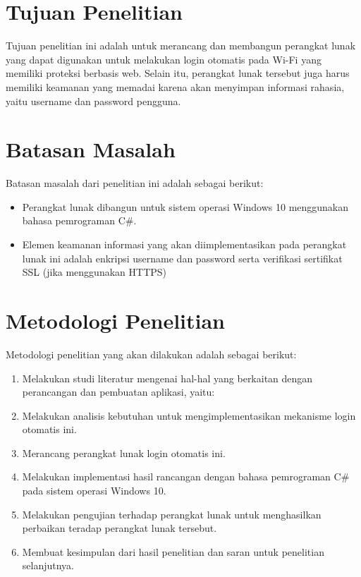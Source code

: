 \section{Tujuan Penelitian}

Tujuan penelitian ini adalah untuk merancang dan membangun perangkat lunak yang dapat digunakan untuk melakukan login otomatis pada Wi-Fi yang memiliki proteksi berbasis web. Selain itu, perangkat lunak tersebut juga harus memiliki keamanan yang memadai karena akan menyimpan informasi rahasia, yaitu username dan password pengguna.



\section{Batasan Masalah}

Batasan masalah dari penelitian ini adalah sebagai berikut:

\begin{itemize}
	\item{Perangkat lunak dibangun untuk sistem operasi Windows 10 menggunakan bahasa pemrograman C\#.}
	\item{Elemen keamanan informasi yang akan diimplementasikan pada perangkat lunak ini adalah enkripsi username dan password serta verifikasi sertifikat SSL (jika menggunakan HTTPS)}
\end{itemize}



\section{Metodologi Penelitian}

Metodologi penelitian yang akan dilakukan adalah sebagai berikut:

\begin{enumerate}
    \item{Melakukan studi literatur mengenai hal-hal yang berkaitan dengan perancangan dan pembuatan aplikasi, yaitu:}
    \item{Melakukan analisis kebutuhan untuk mengimplementasikan mekanisme login otomatis ini.}
    \item{Merancang perangkat lunak login otomatis ini.}
    \item{Melakukan implementasi hasil rancangan dengan bahasa pemrograman C\# pada sistem operasi Windows 10.}
    \item{Melakukan pengujian terhadap perangkat lunak untuk menghasilkan perbaikan teradap perangkat lunak tersebut.}
    \item{Membuat kesimpulan dari hasil penelitian dan saran untuk penelitian selanjutnya.}
\end{enumerate}



